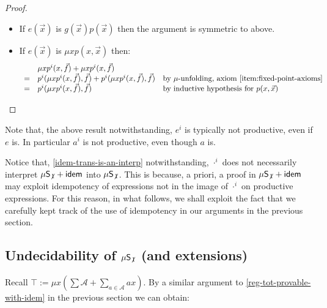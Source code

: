 \documentclass[a4paper,10pt]{amsart}
\newcommand{\df}{:=}
\theoremstyle{definition}
\newtheorem{remark}[theorem]{Remark}
\newcommand{\Alphabet}{\mathcal{A}}
\newcommand{\id}{\mathsf{init}}
\newcommand{\basicax}{\mu\mathsf{S}}
\newcommand{\idem}{\mathsf{idem}}
\newcommand{\basicaxidfree}{\basicax_{\not {\hspace{.1em}1}}}
\renewcommand{\id}[1]{#1^i}
\begin{document}
\begin{proof}
\begin{itemize}
\[\begin{array}{rll}
           = & \id p(\vec f) \id g(\vec f) & \text{by inductive hypothesis for $p(\vec x)$} 
        \end{array}
        \]
        \item If $e(\vec x)$ is $g(\vec x)p(\vec x)$ then the argument is symmetric to above.
        \item If $e(\vec x)$ is $\mu x p(x,\vec x)$ then:
        \[
        \begin{array}{rll}
             & \mu x \id p(x,\vec f) + \mu x \id p(x,\vec f) 
             \\
              =  & \id p (\mu x \id p(x,\vec f),\vec f) + \id p (\mu x \id p(x,\vec f), \vec f) & \text{by $\mu$-unfolding, axiom \eqref{item:fixed-point-axioms}} \\
              = & \id p (\mu x \id p(x,\vec f),\vec f) & \text{by inductive hypothesis for $p(x,\vec x)$} \qedhere
        \end{array}
        \]
    \end{itemize}
\end{proof}

Note that, the above result notwithstanding, $\id e$ is typically not productive, even if $e$ is. In particular $\id a$ is not productive, even though $a$ is.

    Notice that, \cref{idem-trans-is-an-interp} notwithstanding, $\id \cdot$ does not necessarily interpret $\basicaxidfree + \idem$ into $\basicaxidfree$. This is because, a priori, a proof in $\basicaxidfree+\idem$ may exploit idempotency of expressions not in the image of $\id \cdot $ on productive expressions.
    For this reason, in what follows,
    we shall exploit the fact that we carefully kept track of the use of idempotency in our arguments in the previous section.

\subsection{Undecidability of $\basicaxidfree$ (and extensions)}
Recall $\top \df \mu x\left(\sum \Alphabet + \sum\limits_{a\in \Alphabet} ax\right)$.
By a similar argument to \cref{reg-tot-provable-with-idem} in the previous section we can obtain:
\end{document}
